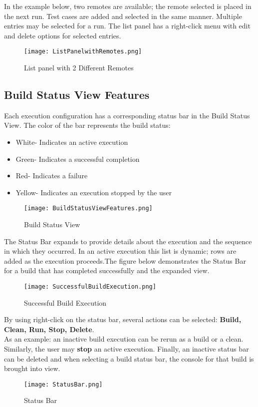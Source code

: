 In the example below, two remotes are available; the remote selected is placed in the next run. Test cases are added and selected in the same manner. Multiple entries may be selected for a run. The list panel has a right-click menu with edit and delete options for selected entries.
\begin{figure}[h!]
    \centering
   \caption{List panel with 2 Different Remotes}
    \texttt{[image: ListPanelwithRemotes.png]}
    \label{fig:List panel with 2 Different Remotes}
\end{figure}
\subsection{Build Status View Features}
Each execution configuration has a corresponding status bar in the Build Status View. The color of the bar represents the build status:
\begin{itemize}
\item White- Indicates an active execution
\item Green- Indicates a successful completion
\item Red- Indicates a failure
\item Yellow- Indicates an execution stopped by the user
\end{itemize}
\begin{figure}[h!]
    \centering
    \caption{Build Status View}
    \texttt{[image: BuildStatusViewFeatures.png]}
      \label{fig:Build Status View}
\end{figure}
The Status Bar expands to provide details about the execution and the sequence in which they occurred. In an active execution this list is dynamic; rows are added as the execution proceeds.The figure below demonstrates the Status Bar for a build that has completed successfully and the expanded view.
\begin{figure}[h!]
    \centering
    \caption{Successful Build Execution}
    \texttt{[image: SuccessfulBuildExecution.png]}
    \label{fig:Expanded View of Successful Build Execution}
\end{figure}

By using right-click on the status bar, several actions can be selected: \textbf{Build, Clean, Run, Stop, Delete}.\\ As an example: an inactive build execution can be rerun as a build or a clean.\\

Similarly, the user may \textbf{stop} an active execution. Finally, an inactive status bar can be deleted and when selecting a build status bar, the console for that build is brought into view.\\
\begin{figure}[h!]
    \centering
   	 \caption{Status Bar}
   		 \texttt{[image: StatusBar.png]}
     \label{fig:statusbar}
\end{figure}
